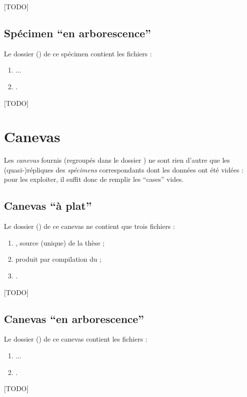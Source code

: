 [TODO]

\subsection{Spécimen \enquote{en arborescence}}
\label{sec-specimen-arborescence}
%
%
%

Le dossier () de ce spécimen contient les
fichiers :
\begin{enumerate}
\item ...
\item {}.
\end{enumerate}

[TODO]

\section{Canevas}
\label{sec-canevas}

Les \emph{canevas} fournis (regroupés dans le dossier ) ne sont
rien d'autre que les (quasi-)répliques des \emph{spécimens} correspondants dont
les données ont été vidées : pour les exploiter, il suffit donc de remplir les
\enquote{cases} vides.

\subsection{Canevas \enquote{à plat}}
\label{sec-canevas-a-plat}
%

Le dossier () de ce canevas ne contient que trois fichiers :
\begin{enumerate}
\item {}, source  (unique) de la thèse  ;
\item {} produit par compilation du  ;
\item {}.
\end{enumerate}

[TODO]

\subsection{Canevas \enquote{en arborescence}}
\label{sec-canevas-arborescence}
%
%
%

Le dossier () de ce canevas contient les fichiers :
\begin{enumerate}
\item ...
\item {}.
\end{enumerate}

[TODO]

